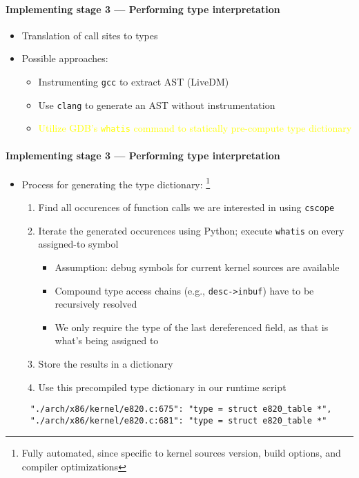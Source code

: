 \documentclass{i20lecture}
\begin{document}
\begin{frame}[fragile]{\insertsection}
  \framesubtitle{Implementing stage 3 --- Performing type interpretation}
    \begin{itemize}
     \item Translation of call sites to types
	 \pause
     \item Possible approaches:
     \begin{itemize}
\pause
      \item Instrumenting \lstinline|gcc| to extract AST (LiveDM)
\pause
      \item Use \lstinline|clang| to generate an AST without instrumentation
\pause
	  \item \textcolor{yellow}{Utilize GDB's \lstinline|whatis| command to statically pre-compute type dictionary}
     \end{itemize}
    \end{itemize}
\end{frame}

\begin{frame}[fragile]{\insertsection}
  \framesubtitle{Implementing stage 3 --- Performing type interpretation}
    \begin{itemize}
     \item Process for generating the type dictionary: \footnote{Fully automated, since specific to kernel sources version, build options, and compiler optimizations}
\pause
     \begin{enumerate}
      \item Find all occurences of function calls we are interested in using \lstinline|cscope|
\pause
      \item Iterate the generated occurences using Python; execute \lstinline|whatis| on every assigned-to symbol
      \begin{itemize}
\pause
       \item Assumption: debug symbols for current kernel sources are available
\pause
       \item Compound type access chains (e.g., \lstinline|desc->inbuf|) have to be recursively resolved
	\pause
	   \item We only require the type of the last dereferenced field, as that is what's being assigned to
      \end{itemize}
\pause
      \item Store the results in a dictionary
\pause
      \item Use this precompiled type dictionary in our runtime script
\pause
     \end{enumerate}
    \end{itemize}
    \begin{lstlisting}
     "./arch/x86/kernel/e820.c:675": "type = struct e820_table *",
     "./arch/x86/kernel/e820.c:681": "type = struct e820_table *"
    \end{lstlisting}
\end{frame}
\end{document}
